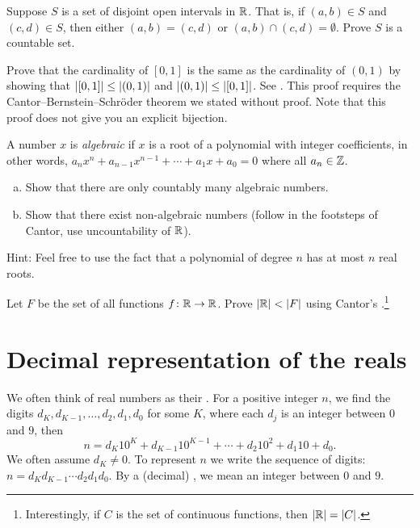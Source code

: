 \begin{exercise}
Suppose $S$ is a set of disjoint open intervals in ${\mathbb{R}}$.  That is, 
if $(a,b) \in S$ and $(c,d) \in S$, then either $(a,b) = (c,d)$
or $(a,b) \cap (c,d) = \emptyset$.  Prove $S$ is a countable set.
\end{exercise}

\begin{exercise}
Prove that the cardinality of $[0,1]$ is the same as the cardinality of
$(0,1)$ by showing that
$\left\lvert {[0,1]} \right\rvert \leq \left\lvert {(0,1)} \right\rvert$ and
$\left\lvert {(0,1)} \right\rvert \leq \left\lvert {[0,1]} \right\rvert$.  See 
.
This proof requires the Cantor--Bernstein--Schr\"oder theorem we
stated without proof.  Note that this proof does not give you an
explicit bijection.
\end{exercise}

\begin{exercise}[Challenging]
A number $x$ is \emph{algebraic} if $x$ is a root of a polynomial with
integer coefficients, in other words, $a_n x^n + a_{n-1} x^{n-1}  + \cdots
+ a_1 x + a_0 = 0$ where all $a_n \in {\mathbb{Z}}$.
\begin{enumerate}[a)]
\item
Show that there are only
countably many algebraic numbers.
\item
Show that there exist non-algebraic
numbers (follow in the footsteps of Cantor, use uncountability of ${\mathbb{R}}$).
\end{enumerate}
Hint: Feel free to use the fact that a polynomial of degree $n$ has at most $n$ real
roots.
\end{exercise}

\begin{exercise}[Challenging]
Let $F$ be the set of all functions $f \colon {\mathbb{R}} \to {\mathbb{R}}$.
Prove $\left\lvert {{\mathbb{R}}} \right\rvert < \left\lvert {F} \right\rvert$
using Cantor's .\footnote{Interestingly,
if $C$ is the set of continuous functions, then $\left\lvert {{\mathbb{R}}} \right\rvert = \left\lvert {C} \right\rvert$.}
\end{exercise}


\sectionnewpage
\section{Decimal representation of the reals}
\label{sec:decimals}


We often think of real numbers as their
\emph{}.  For
a positive integer $n$, we find the digits $d_K,d_{K-1},\ldots,d_2,d_1,d_0$ for some
$K$,
where each $d_j$ is an integer between $0$ and $9$, then
\begin{equation*}
n = d_K {10}^K + d_{K-1} {10}^{K-1} + \cdots + d_2 {10}^2 + d_1 10 + d_0 .
\end{equation*}
We often assume $d_K \not= 0$.  To represent $n$ we write the sequence of
digits: $n = d_K d_{K-1} \cdots d_2 d_1 d_0$.
By a (decimal)
\emph{}, we mean an integer
between $0$ and $9$.

